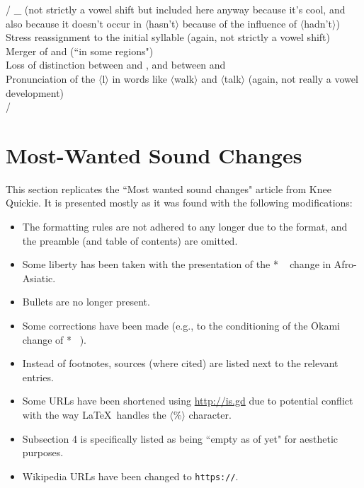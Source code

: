 \documentclass[11pt]{article}
\newcommand{\ipa}{\textipa}
\newcommand{\tab}{\hspace{25pt}}
\newcommand{\change}{\textrightarrow}
\begin{document}
\ipa{z} \textrightarrow\hspace{0pt} \ipa{d} / _\ipa{n} (not strictly a vowel shift but included here anyway because it's cool, and also because it doesn't occur in $\langle$hasn't$\rangle$ because of the influence of $\langle$hadn't$\rangle$) \\
Stress reassignment to the initial syllable (again, not strictly a vowel shift) \\
Merger of  and  (``in some regions") \\
Loss of distinction between  and , and between  and  \\
Pronunciation of the $\langle$l$\rangle$ in words like $\langle$walk$\rangle$ and $\langle$talk$\rangle$ (again, not really a vowel development)\\
\textipa{\ae}/ \textrightarrow\hspace{0pt} 

\clearpage

\section{Most-Wanted Sound Changes}\tab This section replicates the ``Most wanted sound changes" article from Knee Quickie. It is presented mostly as it was found with the following modifications:
\begin{itemize}
\item The formatting rules are not adhered to any longer due to the format, and the preamble (and table of contents) are omitted.
\item Some liberty has been taken with the presentation of the *\ipa{f} \change\ \ipa{p} change in Afro-Asiatic.
\item Bullets are no longer present.
\item Some corrections have been made (e.g., to the conditioning of the \={O}kami change of *\ipa{t} \change\ \ipa{k}).
\item Instead of footnotes, sources (where cited) are listed next to the relevant entries.
\item Some URLs have been shortened using \url{http://is.gd} due to potential conflict with the way \LaTeX\ handles the $\langle$\%$\rangle$ character.
\item Subsection 4 is specifically listed as being ``empty as of yet" for aesthetic purposes.
\item Wikipedia URLs have been changed to \texttt{https://}.
\end{itemize}
\end{document}
